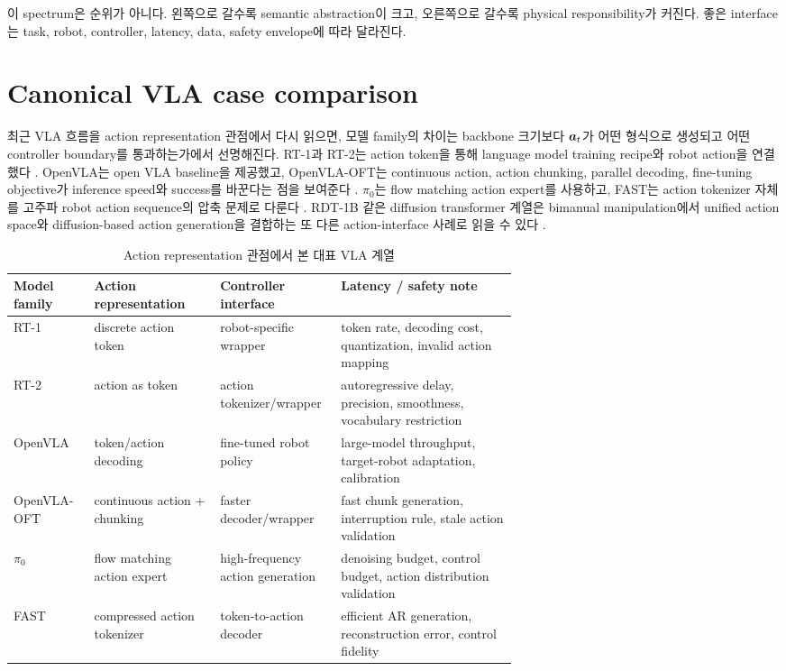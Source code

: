 이 spectrum은 순위가 아니다. 왼쪽으로 갈수록 semantic abstraction이 크고, 오른쪽으로 갈수록 physical responsibility가 커진다. 좋은 interface는 task, robot, controller, latency, data, safety envelope에 따라 달라진다.

\section{Canonical VLA case comparison}

최근 VLA 흐름을 action representation 관점에서 다시 읽으면, 모델 family의 차이는 backbone 크기보다 $\bm{a}_t$가 어떤 형식으로 생성되고 어떤 controller boundary를 통과하는가에서 선명해진다. RT-1과 RT-2는 action token을 통해 language model training recipe와 robot action을 연결했다 \cite{rt12022,rt22023}. OpenVLA는 open VLA baseline을 제공했고, OpenVLA-OFT는 continuous action, action chunking, parallel decoding, fine-tuning objective가 inference speed와 success를 바꾼다는 점을 보여준다 \cite{openvla2024,openvlaoft2025}. $\pi_0$는 flow matching action expert를 사용하고, FAST는 action tokenizer 자체를 고주파 robot action sequence의 압축 문제로 다룬다 \cite{pi02024,fast2025}. RDT-1B 같은 diffusion transformer 계열은 bimanual manipulation에서 unified action space와 diffusion-based action generation을 결합하는 또 다른 action-interface 사례로 읽을 수 있다 \cite{rdt1b2024}.

\begin{table}[h]
  \centering
  \footnotesize
  \setlength{\tabcolsep}{3.5pt}
  \renewcommand{\arraystretch}{1.12}
  \caption{Action representation 관점에서 본 대표 VLA 계열}
  \begin{tabularx}{\linewidth}{@{}>{\RaggedRight\arraybackslash}p{0.16\linewidth}>{\RaggedRight\arraybackslash}p{0.25\linewidth}>{\RaggedRight\arraybackslash}p{0.24\linewidth}>{\RaggedRight\arraybackslash}X@{}}
    \toprule
    Model family & Action representation & Controller interface & Latency / safety note \\
    \midrule
    RT-1 & discrete action token & robot-specific wrapper & token rate, decoding cost, quantization, invalid action mapping \\
    RT-2 & action as token & action tokenizer/wrapper & autoregressive delay, precision, smoothness, vocabulary restriction \\
    OpenVLA & token/action decoding & fine-tuned robot policy & large-model throughput, target-robot adaptation, calibration \\
    OpenVLA-OFT & continuous action + chunking & faster decoder/wrapper & fast chunk generation, interruption rule, stale action validation \\
    $\pi_0$ & flow matching action expert & high-frequency action generation & denoising budget, control budget, action distribution validation \\
    FAST & compressed action tokenizer & token-to-action decoder & efficient AR generation, reconstruction error, control fidelity \\
    \bottomrule
  \end{tabularx}
  \label{tab:ch13-vla-action-cases}
\end{table}

